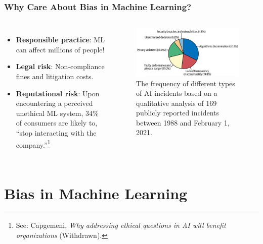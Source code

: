 \documentclass[11pt,aspectratio=169,hyperref={colorlinks}]{beamer}
\begin{document}
		\begin{frame}				
		
			\frametitle{Why Care About Bias in Machine Learning?}
			
			\begin{columns}
			
			\begin{itemize}\small
				\item \textbf{Responsible practice}: ML can affect millions of people! \cite{obermeyer2019dissecting}
				\item \textbf{Legal risk}: Non-compliance fines and litigation costs.
				\item \textbf{Reputational risk}: Upon encountering a perceived unethical ML system, 34\% of consumers are likely to, ``stop interacting with the company.''\footnote{\scriptsize{See: Capgemeni, \textit{Why addressing ethical questions in AI will benefit organizations} (Withdrawn).}}
			\end{itemize}
			
			\centering
			\begin{figure}
			\includegraphics[scale=0.16]{../img/bias_incidents.png}
			\caption{\scriptsize{The frequency of different types of AI incidents based on a qualitative analysis of 169 publicly reported incidents between 1988 and February 1, 2021.}}
			\end{figure}
			
			\end{columns}
			
		\end{frame}

	\section{Bias in Machine Learning}
	
\end{document}
